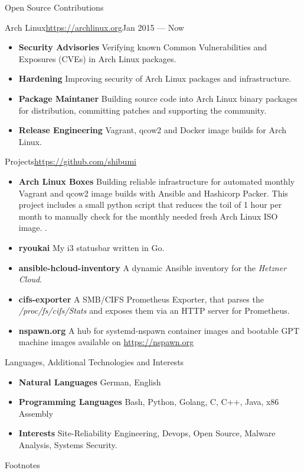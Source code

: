 \documentclass[]{mcdowellcv}
\begin{document}
\begin{cvsection}{Open Source Contributions}
\begin{cvsubsection}{Arch Linux}{\url{https://archlinux.org}}{Jan 2015 --- Now}
\begin{itemize}
\item \textbf{Security Advisories} Verifying known Common Vulnerabilities and Exposures (CVEs) in Arch Linux packages.
\item \textbf{Hardening} Improving security of Arch Linux packages and infrastructure.
\item \textbf{Package Maintaner} Building source code into Arch Linux binary packages for distribution, committing patches and supporting the community.
\item \textbf{Release Engineering} Vagrant, qcow2 and Docker image builds for Arch Linux.
\end{itemize}
\end{cvsubsection}

\begin{cvsubsection}{Projects}{\url{https://github.com/shibumi}}{}
\begin{itemize}
\item \textbf{Arch Linux Boxes} Building reliable infrastructure for automated monthly Vagrant and qcow2 image builds with Ansible and Hashicorp Packer. This project includes a small python script that reduces the toil of 1 hour per month to manually check for the monthly needed fresh Arch Linux ISO image. .
\item \textbf{ryoukai} My i3 statusbar written in Go.
\item \textbf{ansible-hcloud-inventory} A dynamic Ansible inventory for the \textit{Hetzner Cloud}.
\item \textbf{cifs-exporter} A SMB/CIFS Prometheus Exporter, that parses the \textit{/proc/fs/cifs/Stats} and exposes them via an HTTP server for Prometheus.
\item \textbf{nspawn.org} A hub for systemd-nspawn container images and bootable GPT machine images available on \url{https://nspawn.org}
\end{itemize}
\end{cvsubsection}
\end{cvsection}

\begin{cvsection}{Languages, Additional Technologies and Interests}
\begin{cvsubsection}{}{}{}
\begin{itemize}
\item \textbf{Natural Languages} German, English
\item \textbf{Programming Languages} Bash, Python, Golang, C, C++, Java, x86 Assembly
\item \textbf{Interests} Site-Reliability Engineering, Devops, Open Source, Malware Analysis, Systems Security.
\end{itemize}
\end{cvsubsection}
\end{cvsection}

\begin{cvsection}{Footnotes}
\theendnotes
\end{cvsection}
\end{document}
